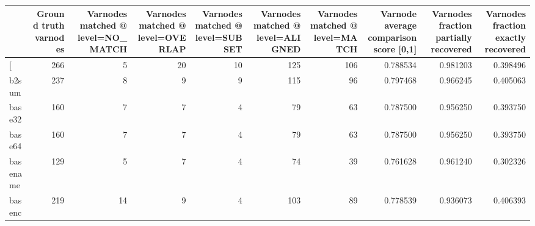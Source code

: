 \begin{tabular}{lrrrrrrrrr}
\toprule
{} &  Ground truth varnodes &  Varnodes matched @ level=NO\_MATCH &  Varnodes matched @ level=OVERLAP &  Varnodes matched @ level=SUBSET &  Varnodes matched @ level=ALIGNED &  Varnodes matched @ level=MATCH &  Varnode average comparison score [0,1] &  Varnodes fraction partially recovered &  Varnodes fraction exactly recovered \\
\midrule
[         &                    266 &                                  5 &                                20 &                               10 &                               125 &                             106 &                                0.788534 &                               0.981203 &                             0.398496 \\
b2sum     &                    237 &                                  8 &                                 9 &                                9 &                               115 &                              96 &                                0.797468 &                               0.966245 &                             0.405063 \\
base32    &                    160 &                                  7 &                                 7 &                                4 &                                79 &                              63 &                                0.787500 &                               0.956250 &                             0.393750 \\
base64    &                    160 &                                  7 &                                 7 &                                4 &                                79 &                              63 &                                0.787500 &                               0.956250 &                             0.393750 \\
basename  &                    129 &                                  5 &                                 7 &                                4 &                                74 &                              39 &                                0.761628 &                               0.961240 &                             0.302326 \\
basenc    &                    219 &                                 14 &                                 9 &                                4 &                               103 &                              89 &                                0.778539 &                               0.936073 &                             0.406393 \\

\end{tabular}
